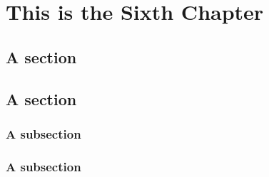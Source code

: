 \documentclass[../ThesisMain]{subfiles}
\begin{document}
\doublespacing%
\chapter{This is the Sixth Chapter}\label{chap:6}
\section{A section}
\lipsum[0-1]

\section{A section}
\subsection{A subsection}
\lipsum[0-1]

\subsection{A subsection}
\lipsum[0-1]
\end{document}

